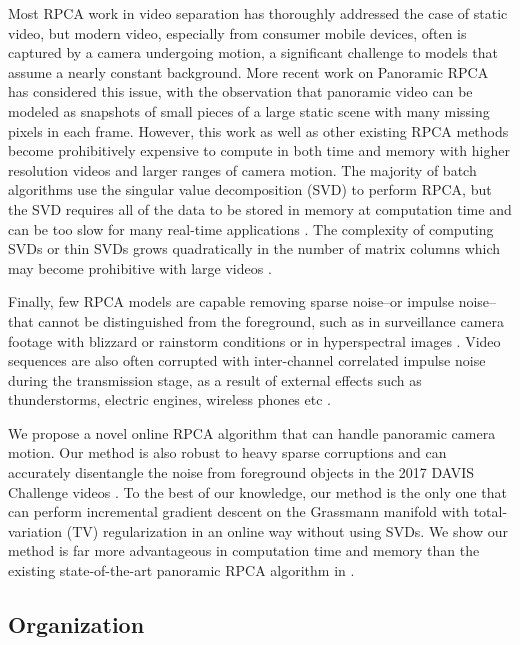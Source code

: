 \documentclass[10pt,twocolumn,letterpaper]{article}
\begin{document}
Most RPCA work in video separation has thoroughly addressed the case of static video, but modern video, especially from consumer mobile devices, often is captured by a camera undergoing motion, a significant challenge to models that assume a nearly constant background. More recent work on Panoramic RPCA \cite{B.Moore} has considered this issue, with the observation that panoramic video can be modeled as snapshots of small pieces of a large static scene with many missing pixels in each frame. However, this work as well as other existing RPCA methods become prohibitively expensive to compute in both time and memory with higher resolution videos and larger ranges of camera motion. The majority of batch algorithms use the singular value decomposition (SVD) to perform RPCA, but the SVD requires all of the data to be stored in memory at computation time and can be too slow for many real-time applications \cite{grasta}. The complexity of computing SVDs or thin SVDs grows quadratically in the number of matrix columns which may become prohibitive with large videos \cite{svd_cost}.

Finally, few RPCA models are capable removing sparse noise--or impulse noise--that cannot be distinguished from the foreground, such as in surveillance camera footage with blizzard or rainstorm conditions \cite{bad_weather_dataset} or in hyperspectral images \cite{Tariyal2016RemovingSN}. Video sequences are also often corrupted with inter-channel correlated impulse noise during the transmission stage, as a result of external effects such as thunderstorms, electric engines, wireless phones etc \cite{rodriguez_wohlberg}.


We propose a novel online RPCA algorithm that can handle panoramic camera motion. Our method is also robust to heavy sparse corruptions and can accurately disentangle the noise from foreground objects in the 2017 DAVIS Challenge videos \cite{DAVIS}. To the best of our knowledge, our method is the only one that can perform incremental gradient descent on the Grassmann manifold with total-variation (TV) regularization in an online way without using SVDs. We show our method is far more advantageous in computation time and memory than the existing state-of-the-art panoramic RPCA algorithm in \cite{B.Moore}.

\subsection{Organization}
\end{document}
